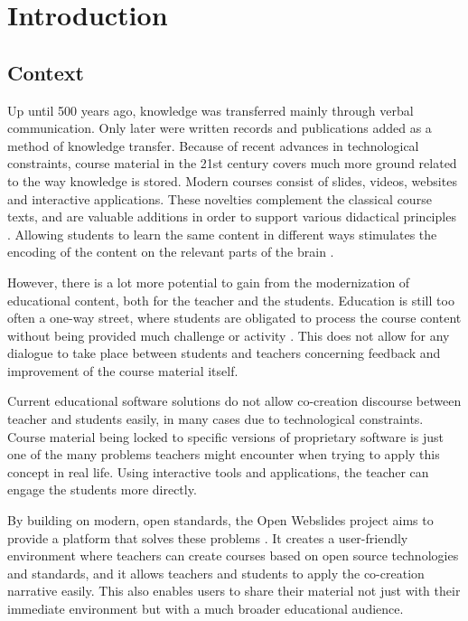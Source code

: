 
\chapter{Introduction}
\label{ch:introduction}

\section{Context}
\label{sec:context}

Up until 500 years ago, knowledge was transferred mainly through verbal communication.
Only later were written records and publications added as a method of knowledge transfer.
Because of recent advances in technological constraints, course material in the 21st century covers much more ground related to the way knowledge is stored.
Modern courses consist of slides, videos, websites and interactive applications.
These novelties complement the classical course texts, and are valuable additions in order to support various didactical principles \autocite{Cocoon2016}.
Allowing students to learn the same content in different ways stimulates the encoding of the content on the relevant parts of the brain \autocite{Paivio1969}.

However, there is a lot more potential to gain from the modernization of educational content, both for the teacher and the students.
Education is still too often a one-way street, where students are obligated to process the course content without being provided much challenge or activity \autocite{OpenWebslides2017}.
This does not allow for any dialogue to take place between students and teachers concerning feedback and improvement of the course material itself.

Current educational software solutions do not allow co-creation discourse between teacher and students easily, in many cases due to technological constraints.
Course material being locked to specific versions of proprietary software is just one of the many problems teachers might encounter when trying to apply this concept in real life.
Using interactive tools and applications, the teacher can engage the students more directly.

By building on modern, open standards, the Open Webslides project aims to provide a platform that solves these problems \autocite{OpenWebslides2017}.
It creates a user-friendly environment where teachers can create courses based on open source technologies and standards, and it allows teachers and students to apply the co-creation narrative easily.
This also enables users to share their material not just with their immediate environment but with a much broader educational audience.

